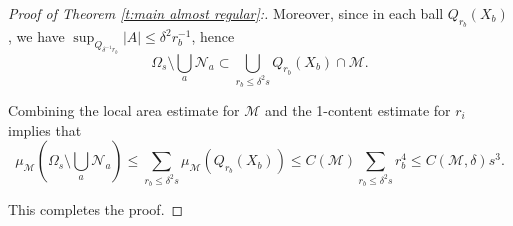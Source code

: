 \documentclass[11pt,reqno]{amsart}
\numberwithin{equation}{section}
\newcommand{\cM}{\mathcal{M}}
\newcommand{\cN}{\mathcal{N}}
\theoremstyle{definition}
\theoremstyle{remark}
\theoremstyle{remark}
\theoremstyle{remark}
\theoremstyle{remark}\newtheorem{conjecture}[equation]{Conjecture}
\theoremstyle{remark}\newtheorem{question}[equation]{Question}
\begin{document}
\begin{proof}[Proof of Theorem \ref{t:main almost regular}:]
Moreover, since in each ball $Q_{r_b}(X_b)$, we have $\sup_{Q_{\delta^{-1} r_b}} |A| \le \delta^2 r_b^{-1}$, hence
\begin{equation*}
    \Omega_s \setminus \bigcup_a \cN_a \subset \bigcup_{r_b \le \delta^2 s} Q_{r_b}(X_b) \cap \cM.
\end{equation*}

Combining the local area estimate for $\cM$ and the 1-content estimate for $r_i$ implies that
\begin{equation*}
    \mu_{\cM }(\Omega_s \setminus \bigcup_a \cN_a) \le \sum_{r_b \le \delta^2 s} \mu_{\cM}(Q_{r_b}(X_b)) \le C(\cM)  \sum_{r_b \le \delta^2 s}  r_b^4 \le C(\cM,\delta) s^3.
\end{equation*}

This completes the proof.    
\end{proof}
\end{document}
